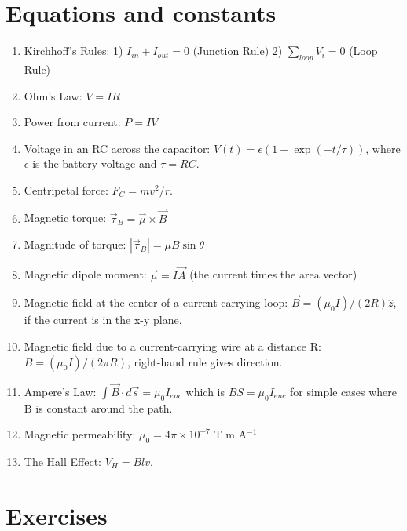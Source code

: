 \documentclass[10pt]{article}
\begin{document}
\maketitle

\section{Equations and constants}

\begin{enumerate}
\item Kirchhoff's Rules: 1) $I_{in} + I_{out} = 0$ (Junction Rule) 2) $\sum_{loop} V_i = 0$ (Loop Rule)
\item Ohm's Law: $V = IR$
\item Power from current: $P=IV$
\item Voltage in an RC across the capacitor: $V(t) = \epsilon\left(1 - \exp\left(-t/\tau\right)\right)$, where $\epsilon$ is the battery voltage and $\tau = RC$.
\item Centripetal force: $F_C = mv^2/r$.
\item Magnetic torque: $\vec{\tau}_B = \vec{\mu} \times \vec{B}$
\item Magnitude of torque: $|\vec{\tau}_B| = \mu B \sin\theta$
\item Magnetic dipole moment: $\vec{\mu} = I \vec{A}$ (the current times the area vector)
\item Magnetic field at the center of a current-carrying loop: $\vec{B} = (\mu_0 I)/(2 R)\hat{z}$, if the current is in the x-y plane.
\item Magnetic field due to a current-carrying wire at a distance R: $B = (\mu_0 I)/(2 \pi R)$, right-hand rule gives direction.
\item Ampere's Law: $\int \vec{B} \cdot d\vec{s} = \mu_0 I_{enc}$ which is $B S = \mu_0 I_{enc}$ for simple cases where B is constant around the path.
\item Magnetic permeability: $\mu_0 = 4\pi \times 10^{-7}$ T m A$^{-1}$
\item The Hall Effect: $V_H = B l v$.
\end{enumerate}

\section{Exercises}
\end{document}
